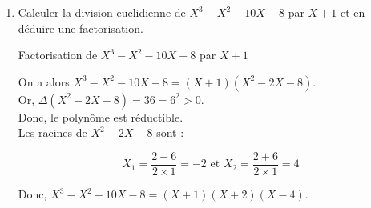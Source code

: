 \begin{enumerate}
\begin{theorem}[black]{Factorisation de $X^3 - 2X^2 - 5X + 6$}
        \noindent Les racines de $X^2 - X - 6$ sont :

        $$
            X_1 = \frac{1 - 5}{2 \times 1} = -2 \text{ et } X_2 = \frac{1 + 5}{2 \times 1} = 3
        $$

        \noindent Donc, $X^3 - 2X^2 - 5X + 6 = (X - 1)(X + 2)(X - 3)$.
    \end{theorem}

    \clearpage
    
    \item Calculer la division euclidienne de $X^3 - X^2 - 10X - 8$ par $X + 1$ et en déduire une factorisation.

    \begin{theorem}[black]{Factorisation de $X^3 - X^2 - 10X - 8$ par $X + 1$}
        \begin{center}
        \end{center}

        \noindent On a alors $X^3 - X^2 - 10X - 8 = (X + 1)(X^2 - 2X - 8)$. \\
        Or, $\Delta(X^2 - 2X - 8) = 36 = 6^2 > 0$. \\
        Donc, le polynôme est réductible. \\

        \noindent Les racines de $X^2 - 2X - 8$ sont :

        $$
            X_1 = \frac{2 - 6}{2 \times 1} = -2 \text{ et } X_2 = \frac{2 + 6}{2 \times 1} = 4
        $$

        \noindent Donc, $X^3 - X^2 - 10X - 8 = (X + 1)(X + 2)(X - 4)$.
    \end{theorem}
\end{enumerate}